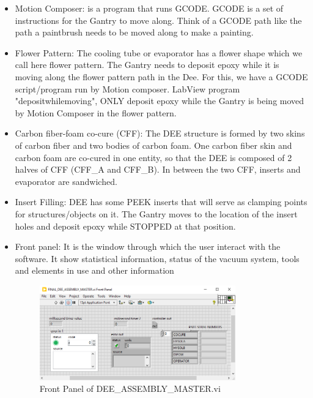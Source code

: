 \documentclass[12pt]{cornelltfpxsop}
\begin{document}
\begin{itemize}
    \item Motion Composer: is a program that runs GCODE. GCODE is a set of instructions for the Gantry to move along. Think of a GCODE path like the path a paintbrush needs to be moved along to make a painting.
    
    \item Flower Pattern: The cooling tube or evaporator has a flower shape which we call here flower pattern. The Gantry needs to deposit epoxy while it is moving along the flower pattern path in the Dee. For this, we have a GCODE script/program run by Motion composer. LabView program "depositwhilemoving", ONLY deposit epoxy while the Gantry is being moved by Motion Composer in the flower pattern.

    \item Carbon fiber-foam co-cure (CFF): The DEE structure is formed by two skins of carbon fiber and two bodies of carbon foam. One carbon fiber skin and carbon foam are co-cured in one entity, so that the DEE is composed of 2 halves of CFF (CFF\_A and CFF\_B). In between the two CFF, inserts and evaporator are sandwiched.    
    
    \item Insert Filling: DEE has some PEEK inserts that will serve as clamping points for structures/objects on it. The Gantry moves to the location of the insert holes and deposit epoxy while STOPPED at that position. 
    
    \item Front panel: It is the window through which the user interact with the software. It show statistical information, status of the vacuum system, tools and elements in use and other information
    \begin{center}
\begin{figure}[h!]
\includegraphics[width=0.8\textwidth]{img/Front_panel2.png}
\caption{Front Panel of DEE_ASSEMBLY_MASTER.vi}
\label{gantry_setup}
\end{figure}
\end{center}
\end{itemize}
\end{document}
